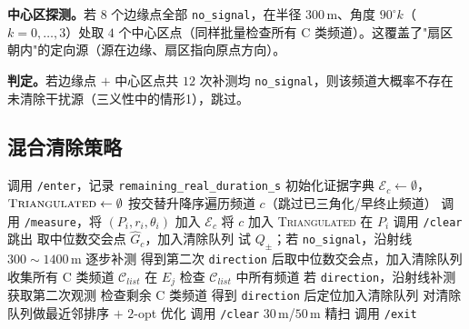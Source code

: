 \documentclass[12pt,a4paper]{ctexart}
\begin{document}
\textbf{中心区探测。}若 $8$ 个边缘点全部 \texttt{no\_signal}，在半径 $300\,\mathrm{m}$、角度 $90^\circ k$（$k=0,\ldots,3$）处取 $4$ 个中心区点（同样批量检查所有 C 类频道）。这覆盖了"扇区朝内"的定向源（源在边缘、扇区指向原点方向）。

\textbf{判定。}若边缘点 $+$ 中心区点共 $12$ 次补测均 \texttt{no\_signal}，则该频道大概率不存在未清除干扰源（三义性中的情形1），跳过。

\subsection{混合清除策略}
\label{sec:q4-strategy}
\begin{algorithm}[H]
\caption{问题四全向与定向混合源检测与清除算法（v2）}
\begin{algorithmic}[1]
\State 调用 \texttt{/enter}，记录 \texttt{remaining\_real\_duration\_s}
\State 初始化证据字典 $\mathcal E_c\leftarrow\emptyset$，$\textsc{Triangulated}\leftarrow\emptyset$
  \State 按交替升降序遍历频道 $c$（跳过已三角化/早终止频道）
  \State 调用 \texttt{/measure}，将 $(P_i,r_i,\theta_i)$ 加入 $\mathcal E_c$
    \State 将 $c$ 加入 \textsc{Triangulated}
   \State 在 $P_i$ 调用 \texttt{/clear}
  \EndIf
   \State 跳出 \EndIf
\EndFor
{}
   
    \State 取中位数交会点 $\widehat G_c$，加入清除队列
   
    \State 试 $Q_\pm$；若 \texttt{no\_signal}，沿射线 $300\sim1400\,\mathrm{m}$ 逐步补测
    \State 得到第二次 \texttt{direction} 后取中位数交会点，加入清除队列
  \Else {}
    \State 收集所有 C 类频道 $\mathcal C_{list}$
      \State 在 $E_j$ 检查 $\mathcal C_{list}$ 中所有频道
      \State 若 \texttt{direction}，沿射线补测获取第二次观测
    \EndFor
        \State 检查剩余 C 类频道
      \EndFor
    \EndIf
    \State 得到 \texttt{direction} 后定位加入清除队列
  \EndIf
\EndFor
\State 对清除队列做最近邻排序 $+$ $2$-opt 优化
  \State 调用 \texttt{/clear}
   \State $30\,\mathrm{m}$/$50\,\mathrm{m}$ 精扫 \EndIf
\EndFor
\State 调用 \texttt{/exit}
\end{algorithmic}
\end{algorithm}
\end{document}
